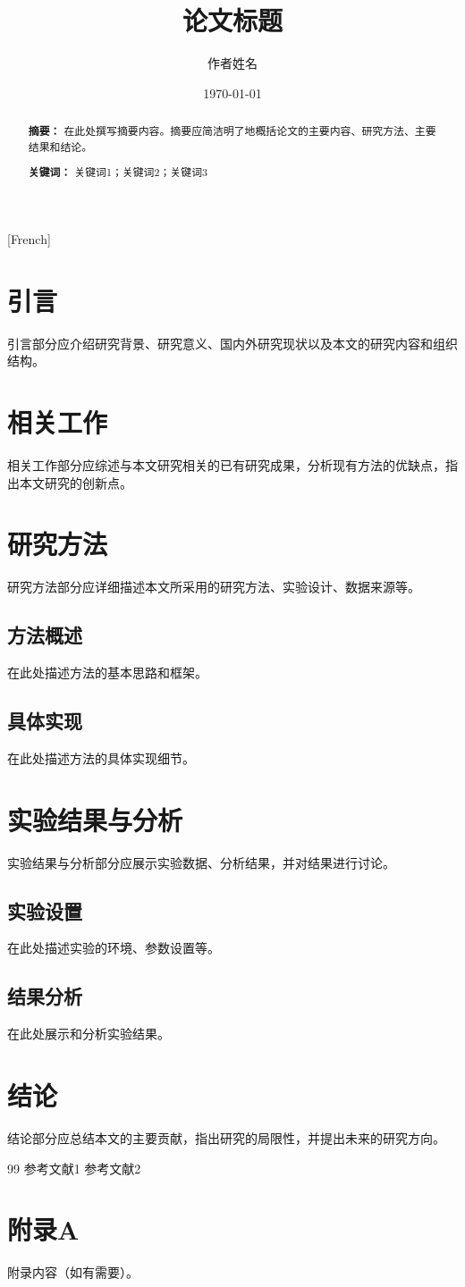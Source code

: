 [French] \documentclass[12pt,a4paper]{article}
\title{论文标题}
\author{作者姓名}
\date{\today}
\begin{document}
\maketitle

\begin{abstract}
\textbf{摘要：} 在此处撰写摘要内容。摘要应简洁明了地概括论文的主要内容、研究方法、主要结果和结论。

\textbf{关键词：} 关键词1；关键词2；关键词3
\end{abstract}

\tableofcontents
\newpage

\section{引言}
引言部分应介绍研究背景、研究意义、国内外研究现状以及本文的研究内容和组织结构。

\section{相关工作}
相关工作部分应综述与本文研究相关的已有研究成果，分析现有方法的优缺点，指出本文研究的创新点。

\section{研究方法}
研究方法部分应详细描述本文所采用的研究方法、实验设计、数据来源等。

\subsection{方法概述}
在此处描述方法的基本思路和框架。

\subsection{具体实现}
在此处描述方法的具体实现细节。

\section{实验结果与分析}
实验结果与分析部分应展示实验数据、分析结果，并对结果进行讨论。

\subsection{实验设置}
在此处描述实验的环境、参数设置等。

\subsection{结果分析}
在此处展示和分析实验结果。

\section{结论}
结论部分应总结本文的主要贡献，指出研究的局限性，并提出未来的研究方向。

\begin{thebibliography}{99}
 参考文献1
 参考文献2
\end{thebibliography}

\appendix
\section{附录A}
附录内容（如有需要）。
\end{document}
